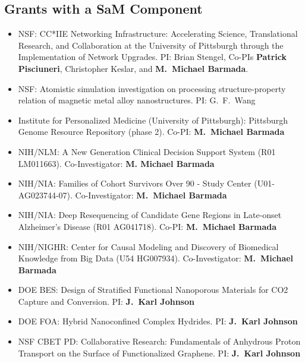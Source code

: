 \subsection{Grants with a SaM Component}
\begin{itemize}
    \item NSF: CC*IIE Networking Infrastructure: Accelerating Science,
          Translational Research, and Collaboration at the University of
          Pittsburgh through the Implementation of Network Upgrades.  PI:
          Brian Stengel, Co-PIs \textbf{Patrick Pisciuneri}, Christopher
          Keslar, and \textbf{M.\ Michael Barmada}.

    \item NSF: Atomistic simulation investigation on processing structure-property relation of magnetic metal alloy nanostructures.  PI: G.\ F.\ Wang

    \item Institute for Personalized Medicine (University of Pittsburgh): Pittsburgh Genome Resource Repository (phase 2). Co-PI: \textbf{M.\ Michael Barmada}

    \item NIH/NLM: A New Generation Clinical Decision Support System (R01
          LM011663). Co-Investigator: \textbf{M. Michael Barmada}

    \item NIH/NIA: Families of Cohort Survivors Over 90 - Study Center
          (U01-AG023744-07). Co-Investigator: \textbf{M.\ Michael
          Barmada}

    \item NIH/NIA: Deep Resequencing of Candidate Gene Regions in Late-onset Alzheimer's Disease (R01 AG041718). Co-PI: \textbf{M.\ Michael
          Barmada}

    \item NIH/NIGHR: Center for Causal Modeling and Discovery of Biomedical Knowledge from Big Data (U54 HG007934). Co-Investigator: \textbf{M.\ Michael Barmada}

	\item DOE BES: Design of Stratified Functional Nanoporous Materials for CO2 Capture and Conversion. PI: \textbf{J.\ Karl Johnson}

	\item DOE FOA: Hybrid Nanoconfined Complex Hydrides. PI: \textbf{J.\ Karl Johnson}

	\item NSF CBET PD: Collaborative Research: Fundamentals of Anhydrous Proton Transport on the Surface of Functionalized Graphene. PI: \textbf{J.\ Karl Johnson}


\end{itemize}
